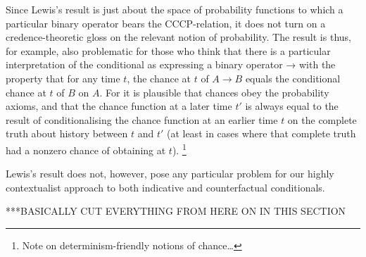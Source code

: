 \documentclass[If.tex]{subfiles}
\begin{document}
Since Lewis's result is just about the space of probability functions to which a particular binary operator bears the CCCP-relation, it does not turn on a credence-theoretic gloss on the relevant notion of probability. The result is thus, for example, also problematic for those who think that there is a particular interpretation of the conditional as expressing a binary operator → with the property that for any time $t$, the chance at $t$ of $A→B$ equals the conditional chance at $t$ of $B$ on $A$. For it is plausible that chances obey the probability axioms, and that the chance function at a later time $t'$ is always equal to the result of conditionalising the chance function at an earlier time $t$ on the complete truth about history between $t$ and $t'$ (at least in cases where that complete truth had a nonzero chance of obtaining at $t$).%
\footnote{Note on determinism-friendly notions of chance\ldots{}}

Lewis's result does not, however, pose any particular problem for our highly contextualist approach to both indicative and counterfactual conditionals. 

***BASICALLY CUT EVERYTHING FROM HERE ON IN THIS SECTION
\end{document}
